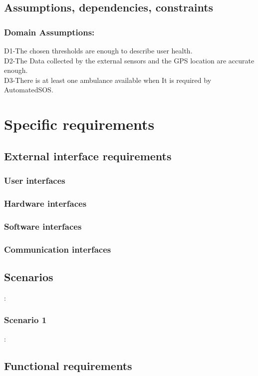 \documentclass[12pt]{article}
\begin{document}
 \subsection{Assumptions, dependencies, constraints}
 \subsubsection{Domain Assumptions:}
D1-The chosen thresholds are enough to describe user health.\\
D2-The Data collected by the external sensors and the GPS location are accurate enough.\\
D3-There is at least one ambulance available when It is required by AutomatedSOS.\\


\clearpage
\section{Specific requirements}
\label{sec:specreq}

  \subsection{External interface requirements}
    \subsubsection{User interfaces}
    \subsubsection{Hardware interfaces}
    \subsubsection{Software interfaces}
    \subsubsection{Communication interfaces}
   \subsection{Scenarios}:
  \subsubsection{Scenario 1}:

  \subsection{Functional requirements}
\end{document}
